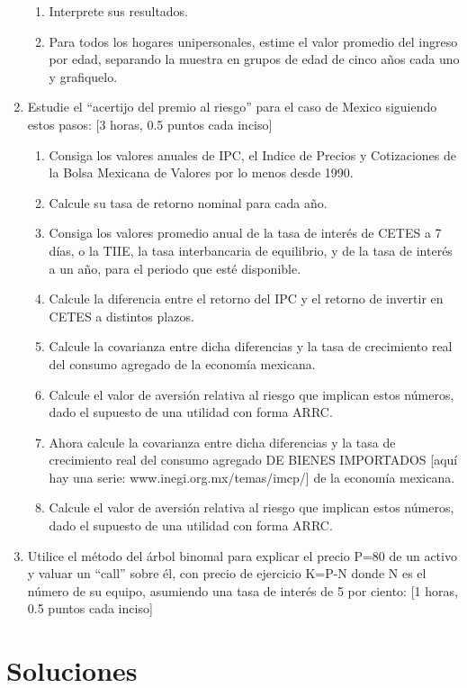 \documentclass[
]{article}
\begin{document}
\begin{enumerate}
\begin{enumerate}
\item Interprete sus resultados.
\item Para todos los hogares unipersonales, estime el valor promedio del ingreso por edad, separando la muestra en grupos de edad de cinco años cada uno y grafiquelo.
\end{enumerate}
\item Estudie el ``acertijo del premio al riesgo'' para el caso de Mexico siguiendo estos pasos: [3 horas, 0.5 puntos cada inciso]
\begin{enumerate}
\item Consiga los valores anuales de IPC, el Indice de Precios y Cotizaciones de la Bolsa Mexicana de Valores por lo menos desde 1990.
\item Calcule su tasa de retorno nominal para cada año.
\item Consiga los valores promedio anual de la tasa de interés de CETES a 7 días, o la TIIE, la tasa interbancaria de equilibrio, y de la tasa de interés a un año, para el periodo que esté disponible.
\item Calcule la diferencia entre el retorno del IPC y el retorno de invertir en CETES a distintos plazos.
\item Calcule la covarianza entre dicha diferencias y  la tasa de crecimiento real del consumo agregado de la economía mexicana. 
\item Calcule el valor de aversión relativa al riesgo que implican estos números, dado el supuesto de una utilidad con forma ARRC.
\item Ahora calcule la covarianza entre dicha diferencias y  la tasa de crecimiento real del consumo agregado DE BIENES IMPORTADOS [aquí hay una serie: www.inegi.org.mx/temas/imcp/] de la economía mexicana. 
\item Calcule el valor de aversión relativa al riesgo que implican estos números, dado el supuesto de una utilidad con forma ARRC.
\end{enumerate}

\item Utilice el método del árbol binomal para explicar el precio P=80 de un activo y valuar un ``call'' sobre él, con precio de ejercicio K=P-N donde N es el número de su equipo, asumiendo una tasa de interés de 5 por ciento: [1 horas, 0.5 puntos cada inciso]
\end{enumerate}
\newpage

\hypertarget{soluciones}{%
\section{Soluciones}\label{soluciones}}
\end{document}
